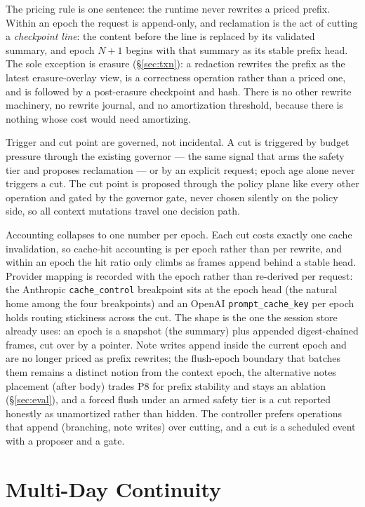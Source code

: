 \documentclass[11pt]{article}
\begin{document}
The pricing rule is one sentence: the runtime never rewrites a priced prefix. Within an epoch the request is append-only, and reclamation is the act of cutting a \emph{checkpoint line}: the content before the line is replaced by its validated summary, and epoch $N{+}1$ begins with that summary as its stable prefix head. The sole exception is erasure (\S\ref{sec:txn}): a redaction rewrites the prefix as the latest erasure-overlay view, is a correctness operation rather than a priced one, and is followed by a post-erasure checkpoint and hash. There is no other rewrite machinery, no rewrite journal, and no amortization threshold, because there is nothing whose cost would need amortizing.

Trigger and cut point are governed, not incidental. A cut is triggered by budget pressure through the existing governor --- the same signal that arms the safety tier and proposes reclamation --- or by an explicit request; epoch age alone never triggers a cut. The cut point is proposed through the policy plane like every other operation and gated by the governor gate, never chosen silently on the policy side, so all context mutations travel one decision path.

Accounting collapses to one number per epoch. Each cut costs exactly one cache invalidation, so cache-hit accounting is per epoch rather than per rewrite, and within an epoch the hit ratio only climbs as frames append behind a stable head. Provider mapping is recorded with the epoch rather than re-derived per request: the Anthropic \texttt{cache\_control} breakpoint sits at the epoch head (the natural home among the four breakpoints) and an OpenAI \texttt{prompt\_cache\_key} per epoch holds routing stickiness across the cut. The shape is the one the session store already uses: an epoch is a snapshot (the summary) plus appended digest-chained frames, cut over by a pointer. Note writes append inside the current epoch and are no longer priced as prefix rewrites; the flush-epoch boundary that batches them remains a distinct notion from the context epoch, the alternative notes placement (after body) trades P8 for prefix stability and stays an ablation (\S\ref{sec:eval}), and a forced flush under an armed safety tier is a cut reported honestly as unamortized rather than hidden. The controller prefers operations that append (branching, note writes) over cutting, and a cut is a scheduled event with a proposer and a gate.

\section{Multi-Day Continuity}
\end{document}
